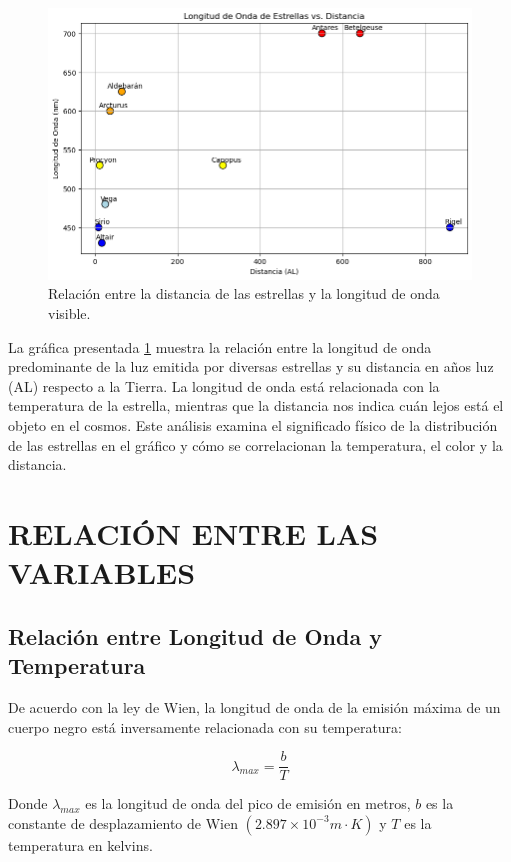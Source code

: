 \documentclass{article}
\begin{document}
 \begin{figure}[h!]
        \begin{center}
        \includegraphics[width=4.5in]{longitudes de onda.png}
            \caption{Relación entre la distancia de las estrellas y la longitud de onda visible.}
            \label{fig1}
        \end{center}
    \end{figure}
    
La gráfica presentada \ref{fig1} muestra la relación entre la longitud de onda predominante de la luz emitida por diversas estrellas y su distancia en años luz (AL) respecto a la Tierra. La longitud de onda está relacionada con la temperatura de la estrella, mientras que la distancia nos indica cuán lejos está el objeto en el cosmos. Este análisis examina el significado físico de la distribución de las estrellas en el gráfico y cómo se correlacionan la temperatura, el color y la distancia.

\section{RELACIÓN ENTRE LAS VARIABLES}
\subsection{Relación entre Longitud de Onda y Temperatura}

De acuerdo con la ley de Wien, la longitud de onda de la emisión máxima de un cuerpo negro está inversamente relacionada con su temperatura:

\[ \lambda_{max} = \frac{b}{T} \]

Donde \( \lambda_{max} \) es la longitud de onda del pico de emisión en metros, \( b \) es la constante de desplazamiento de Wien $(2.897 \times 10^{-3} m\cdot K) $ y \( T \) es la temperatura en kelvins.
\end{document}
